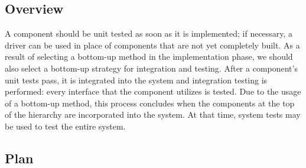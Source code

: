 \documentclass[../../main.tex]{subfiles}
\begin{document}
\subsection{Overview}

A component should be unit tested as soon as it is implemented; if necessary, a driver can be used in place of components that are not yet completely built. As a result of selecting a bottom-up method in the implementation phase, we should also select a bottom-up strategy for integration and testing. After a component's unit tests pass, it is integrated into the system and integration testing is performed: every interface that the component utilizes is tested. Due to the usage of a bottom-up method, this process concludes when the components at the top of the hierarchy are incorporated into the system. At that time, system tests may be used to test the entire system.

\subsection{Plan}
\end{document}
